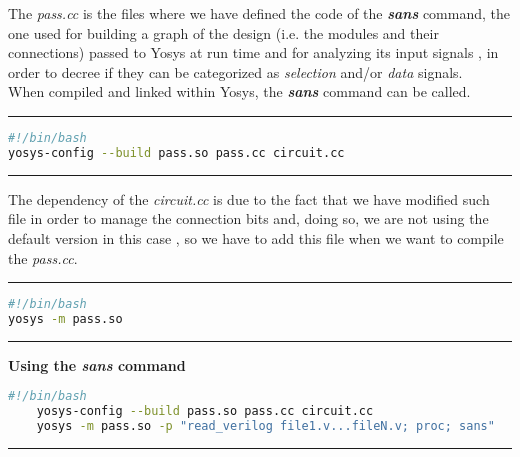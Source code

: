 \documentclass{article}
\newcommand{\sectionbreak}{\clearpage}
\begin{document}
The \textit{pass.cc} is the files where we have defined the code of the \textbf{\textit{sans}} command, the one used for building a graph of 
the design (i.e. the modules and their connections) passed to Yosys at run time and for analyzing its input signals , in order to decree if they can be 
categorized as \textit{selection} and/or \textit{data} signals.\\
When compiled and linked within Yosys, the \textbf{\textit{sans}} command can be called.

\par\noindent\rule{\textwidth}{0.4pt}

\begin{lstlisting}[language=bash,caption={bash command for compiling the pass.cc external module}]
#!/bin/bash
yosys-config --build pass.so pass.cc circuit.cc
\end{lstlisting}

\par\noindent\rule{\textwidth}{0.4pt}

The dependency of the \textit{circuit.cc} is due to the fact that we have modified such file in order to manage the connection bits and, doing
so, we are not using the default version in this case , so we have to add this file when we want to compile the \textit{pass.cc}.

\par\noindent\rule{\textwidth}{0.4pt}

\begin{lstlisting}[language=bash,caption={command for linking the previously compiled external module in Yosys}]
#!/bin/bash
yosys -m pass.so
\end{lstlisting}

\par\noindent\rule{\textwidth}{0.4pt}

\textbf{Using the \textit{sans} command} 
\begin{lstlisting}[language=bash,caption={}]
#!/bin/bash
	yosys-config --build pass.so pass.cc circuit.cc
	yosys -m pass.so -p "read_verilog file1.v...fileN.v; proc; sans"
\end{lstlisting}

\par\noindent\rule{\textwidth}{0.4pt}

\sectionbreak{\clearpage}

\end{document}
